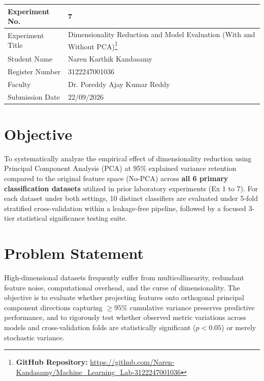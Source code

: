 \documentclass[12pt,a4paper]{article}
\begin{document}
\begin{tabular}{|p{4cm}|p{11cm}|}
\hline
Experiment No. & 7 \\ \hline
Experiment Title & Dimensionality Reduction and Model Evaluation (With and Without PCA)\footnote{\textbf{GitHub Repository: }\url{https://github.com/Naren-Kandasamy/Machine_Learning_Lab-3122247001036}}\\ \hline
Student Name & Naren Karthik Kandasamy \\ \hline
Register Number & 3122247001036 \\ \hline
Faculty & Dr. Poreddy Ajay Kumar Reddy \\ \hline
Submission Date & 22/09/2026 \\ \hline
\end{tabular}

\vspace{1em}

\section{Objective}
To systematically analyze the empirical effect of dimensionality reduction using Principal Component Analysis (PCA) at 95\% explained variance retention compared to the original feature space (No-PCA) across \textbf{all 6 primary classification datasets} utilized in prior laboratory experiments (Ex 1 to 7). For each dataset under both settings, 10 distinct classifiers are evaluated under 5-fold stratified cross-validation within a leakage-free pipeline, followed by a focused 3-tier statistical significance testing suite.

\section{Problem Statement}
High-dimensional datasets frequently suffer from multicollinearity, redundant feature noise, computational overhead, and the curse of dimensionality. The objective is to evaluate whether projecting features onto orthogonal principal component directions capturing $\ge 95\%$ cumulative variance preserves predictive performance, and to rigorously test whether observed metric variations across models and cross-validation folds are statistically significant ($p < 0.05$) or merely stochastic variance.
\end{document}
